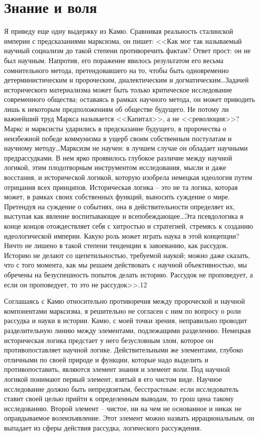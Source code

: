 \documentclass{book}
\begin{document}
\section{Знание и воля}

Я приведу еще одну выдержку из Камю. Сравнивая реальность сталинской империи с предсказаниями марксизма, он пишет:
<<Как мог так называемый научный социализм до такой степени противоречить фактам? Ответ прост: он не был научным. Напротив, его поражение явилось результатом его весьма сомнительного метода, претендовавшего на то, чтобы быть одновременно детерминистическим и пророческим, диалектическим и догматическим\ldots Задачей исторического материализма может быть только критическое исследование современного общества; оставаясь в рамках научного метода, он может приводить лишь к некоторым предположениям об обществе будущего. Не потому ли важнейший труд Маркса называется <<Капитал>>, а не <<революция>>? Маркс и марксисты ударились в предсказание будущего, в пророчества о неизбежной победе коммунизма в ущерб своим собственным постулатам и научному методу\ldots Марксизм не научен: в лучшем случае он обладает научными предрассудками. В нем ярко проявилось глубокое различие между научной логикой, этим плодотворным инструментом исследования, мысли и даже восстания, и исторической логикой, которую изобрела немецкая идеология путем 
отрицания всех принципов. Историческая логика -- это не та логика, которая может, в рамках своих собственных функций, выносить сужде­ние о мире. Претендуя на суждение о событиях, она в действи­тельности определяет их, выступая как явление воспитывающее и всепобеждающее\ldots Эта псевдологика в конце концов отождествляет себя с хитростью и стратегией, стремясь к созданию идеологической империи. Какую роль может играть наука в этой концепции? Ничто не лишено в такой степени тенденции к завоеванию, как рассудок. Историю не делают со щепетиль­ностью, требуемой наукой; можно даже сказать, что с того мо­мента, как мы решаем действовать с научной объективностью, мы обречены на безуспешность попыток делать историю. Рас­судок не проповедует, а если он проповедует, то это не рассу­док>>.12

Соглашаясь с Камю относительно противоречия между пророческой и научной компонентами марксизма, я решительно не согласен с ним по вопросу о роли рассудка и науки в истории. Камю, с моей точки зрения, неправильно проводит разделительную линию между элементами, подлежащими разделению. Немецкая историческая логика предстает у него безусловным злом, которое он противопоставляет научной логике. Действительными же элементами, глубоко отличными по своей природе и функции, которые надо выделить и противопоставить, являются элемент знания и элемент воли. Под научной логикой понимают первый элемент, взятый в его чистом виде. Научное исследование должно быть непредвзятым, бесстрастным: если исследователь ставит своей целью прийти к определенным выводам, то грош цена такому исследованию. Второй элемент -- чистое, ни на чем не основанное и никак не оправдываемое волеизъявление. Этот элемент можно назвать иррациональным, он выпадает из сферы действия рассудка, логического рассуждения.
\end{document}
